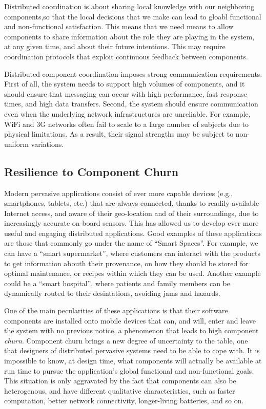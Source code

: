 Distributed coordination is about sharing local knowledge with our neighboring components,so that the local decisions that we make can lead to gloabl functional and non-functional satisfaction. This means that we need means to allow components to share information about the role they are playing in the system, at any given time, and about their future intentions. This may require coordination protocols that exploit continuous feedback between components.

Distributed component coordination imposes strong communication requirements. First of all, the system needs to support high volumes of components, and it should ensure that messaging can occur with high performance, fast response times, and high data transfers. Second, the system should ensure communication even when the underlying network infrastructures are unreliable. For example, WiFi and 3G networks often fail to scale to a large number of subjects due to physical limitations. As a result, their signal strengths may be subject to non-uniform variations. 


\subsection{Resilience to Component Churn}
\label{sub:resilience}

Modern pervasive applications consist of ever more capable devices (e.g., smartphones, tablets, etc.) that are always connected, thanks to readily available Internet access, and aware of their geo-location and of their surroundings, due to increasingly accurate on-board sensors. This has allowed us to develop ever more useful and engaging distributed applications. Good examples of these applications are those that commonly go under the name of ``Smart Spaces''. For example, we can have a ``smart supermarket'', where customers can interact with the products to get information abouth their provenance, on how they should be stored for optimal maintenance, or recipes within which they can be used. Another example could be a ``smart hospital'', where patients and family members can be dynamically routed to their desintations, avoiding jams and hazards.

One of the main pecularities of these applications is that their software components are installed onto mobile devices that can, and will, enter and leave the system with no previous notice, a phenomenon that leads to high component \emph{churn}. Component churn brings a new degree of uncertainty to the table, one that designers of distributed pervasive systems need to be able to cope with. It is impossible to know, at design time, what components will actually be available at run time to pursue the application's global functional and non-functional goals. This situation is only aggravated by the fact that components can also be heterogenous, and have different qualitative characteristics, such as faster computation, better network connectivity, longer-living batteries, and so on. 

